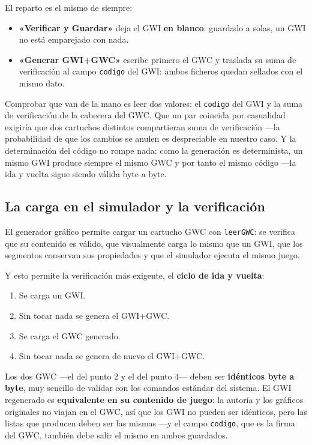 El reparto es el mismo de siempre:

\begin{itemize}	
	\item \textbf{«Verificar y Guardar»} deja el GWI
	\textbf{en blanco}: guardado a solas, un GWI no está emparejado
	con nada.	
	\item \textbf{«Generar GWI+GWC»} escribe primero el GWC y
	traslada su suma de verificación al campo \texttt{codigo} del
	GWI: ambos ficheros quedan sellados con el mismo dato.
\end{itemize}

Comprobar que van de la mano es leer dos valores: el
\texttt{codigo} del GWI y la suma de verificación de la cabecera
del GWC. Que un par coincida por casualidad exigiría que dos
cartuchos distintos compartieran suma de verificación —la
probabilidad de que los cambios se anulen es despreciable en
nuestro caso. Y la determinación del código no rompe nada: como la
generación es determinista, un mismo GWI produce siempre el mismo
GWC y por tanto el mismo código —la ida y vuelta sigue siendo
válida byte a byte.

\subsection{La carga en el simulador y la verificación}\label{sec:F5I6Carga}

El generador gráfico permite cargar un cartucho GWC con
\texttt{leerGWC}: se verifica que su contenido es válido, que
visualmente carga lo mismo que un GWI, que los segmentos conservan
sus propiedades y que el simulador ejecuta el mismo juego.

Y esto permite la verificación más exigente, el \textbf{ciclo de
	ida y vuelta}:

\begin{enumerate}	
	\item Se carga un GWI.	
	\item Sin tocar nada se genera el GWI+GWC.	
	\item Se carga el GWC generado.	
	\item Sin tocar nada se genera de nuevo el GWI+GWC.
\end{enumerate}

Los dos GWC —el del punto 2 y el del punto 4— deben ser
\textbf{idénticos byte a byte}, muy sencillo de validar con los
comandos estándar del sistema. El GWI regenerado es
\textbf{equivalente en su contenido de juego}: la autoría y los
gráficos originales no viajan en el GWC, así que los GWI no pueden
ser idénticos, pero las listas que producen deben ser las mismas
—y el campo \texttt{codigo}, que es la firma del GWC, también debe
salir el mismo en ambos guardados.

